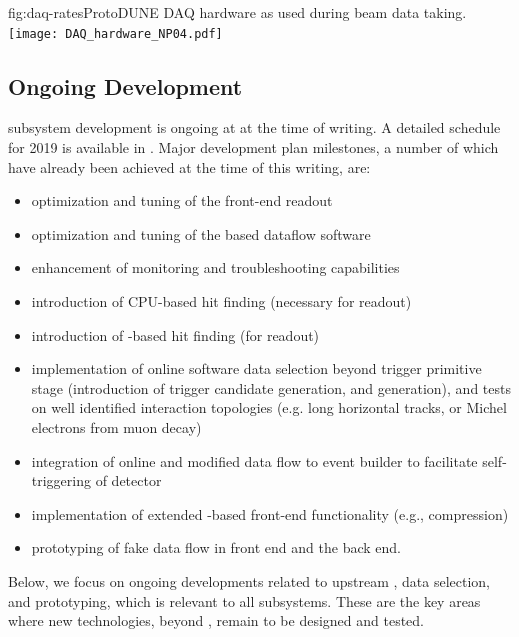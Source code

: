 \begin{dunefigure}{fig:daq-rates}{ProtoDUNE DAQ hardware as used during beam data taking. \label{fig:daq:protodunedaqpic}}
  \texttt{[image: DAQ\_hardware\_NP04.pdf]}
\end{dunefigure}


\subsection{Ongoing Development}
\label{sec:daq:design-validation}

 subsystem development is ongoing at  at the time of
writing. A detailed schedule for 2019 is available
in \cite{bib:docdb14095}. Major development plan milestones, a number
of which have already been achieved at the time of this writing, are:
\begin{itemize}
\item optimization and tuning of the front-end readout
\item optimization and tuning of the  based dataflow software
\item enhancement of monitoring and troubleshooting capabilities
\item introduction of CPU-based hit finding (necessary for  readout)
\item introduction of -based hit finding (for  readout)
\item implementation of online software data selection beyond trigger
primitive stage (introduction of trigger candidate generation, and
 generation), and tests on well identified interaction
topologies (e.g. long horizontal tracks, or Michel electrons from muon decay)
\item integration of online  and modified data flow to event
builder to facilitate self-triggering of detector
\item implementation of extended -based front-end functionality
(e.g., compression)
\item prototyping of fake  data flow in front end and the back end.
\end{itemize}

Below, we focus on ongoing developments related to upstream ,
data selection, and  prototyping, which is relevant to all  subsystems. These are the key areas where new technologies, beyond , remain to be designed and tested.


